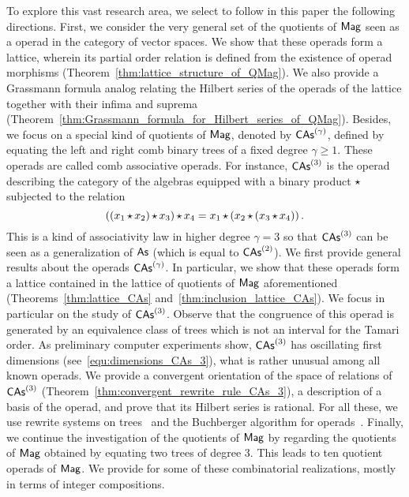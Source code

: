 To explore this vast research area, we select to follow in this paper
the following directions. First, we consider the very general set of the
quotients of $\mathsf{Mag}$ seen as a operad in the category of vector spaces.
We show that these operads form a lattice, wherein its partial order
relation is defined from the existence of operad morphisms
(Theorem~\ref{thm:lattice_structure_of_QMag}). We also provide a
Grassmann formula analog relating the Hilbert series of the operads of
the lattice together with their infima and suprema
(Theorem~\ref{thm:Grassmann_formula_for_Hilbert_series_of_QMag}).
Besides, we focus on a special kind of quotients of $\mathsf{Mag}$, denoted by
$\mathsf{CAs}^{\left(\gamma\right)}$, defined by equating the left and right comb binary trees
of a fixed degree $\gamma \geq 1$. These operads are called comb
associative operads. For instance, $\mathsf{CAs}^{\left(3\right)}$ is the operad describing
the category of the algebras equipped with a binary product $\operatorname{\star}$
subjected to the relation
\begin{equation}
    \left(\left(x_1 \operatorname{\star} x_2\right) \operatorname{\star} x_3\right) \operatorname{\star} x_4
    =
    x_1 \operatorname{\star} \left(x_2 \operatorname{\star} \left(x_3 \operatorname{\star} x_4\right)\right).
\end{equation}
This is a kind of associativity law in higher degree $\gamma = 3$ so
that $\mathsf{CAs}^{\left(3\right)}$ can be seen as a generalization of $\mathsf{As}$ (which is equal
to $\mathsf{CAs}^{\left(2\right)}$). We first provide general results about the operads
$\mathsf{CAs}^{\left(\gamma\right)}$. In particular, we show that these operads form a lattice
contained in the lattice of quotients of $\mathsf{Mag}$ aforementioned
(Theorems~\ref{thm:lattice_CAs} and~\ref{thm:inclusion_lattice_CAs}). We
focus in particular on the study of $\mathsf{CAs}^{\left(3\right)}$. Observe that the
congruence of this operad is generated by an equivalence class of trees
which is not an interval for the Tamari order. As preliminary computer
experiments show, $\mathsf{CAs}^{\left(3\right)}$ has oscillating first dimensions
(see~\eqref{equ:dimensions_CAs_3}), what is rather unusual among all
known operads. We provide a convergent orientation of the space of
relations of $\mathsf{CAs}^{\left(3\right)}$ (Theorem~\ref{thm:convergent_rewrite_rule_CAs_3}),
a description of a basis of the operad, and prove that its Hilbert series
is rational.
%
%
For all these, we use rewrite systems on trees~\cite{BN98} and the
Buchberger algorithm for operads~\cite{DK10}. Finally, we continue the
investigation of the quotients of $\mathsf{Mag}$ by regarding the quotients of
$\mathsf{Mag}$ obtained by equating two trees of degree $3$. This leads to ten
quotient operads of $\mathsf{Mag}$. We provide for some of these combinatorial
realizations, mostly in terms of integer compositions.
\medbreak

